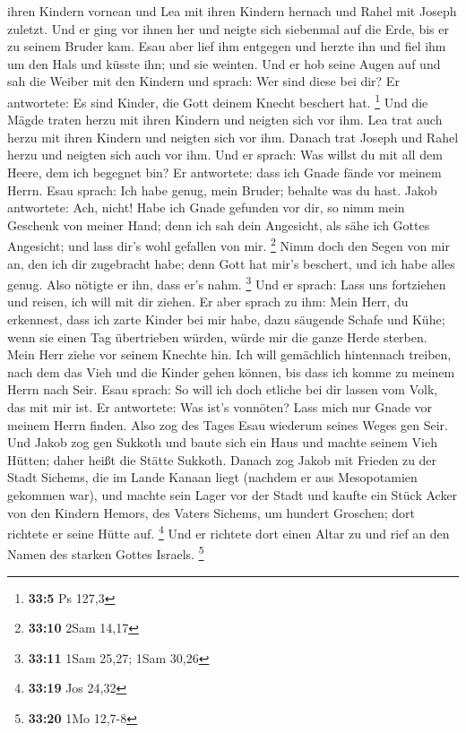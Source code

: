 ihren Kindern vornean und Lea mit ihren Kindern hernach und Rahel mit
Joseph zuletzt.  Und er ging vor ihnen her und neigte sich
siebenmal auf die Erde, bis er zu seinem Bruder kam.  Esau
aber lief ihm entgegen und herzte ihn und fiel ihm um den Hals und
küsste ihn; und sie weinten.  Und er hob seine Augen auf
und sah die Weiber mit den Kindern und sprach: Wer sind diese bei dir?
Er antwortete: Es sind Kinder, die Gott deinem Knecht beschert hat.
\footnote{\textbf{33:5} Ps 127,3}  Und die Mägde traten
herzu mit ihren Kindern und neigten sich vor ihm.  Lea
trat auch herzu mit ihren Kindern und neigten sich vor ihm. Danach trat
Joseph und Rahel herzu und neigten sich auch vor ihm.  Und
er sprach: Was willst du mit all dem Heere, dem ich begegnet bin? Er
antwortete: dass ich Gnade fände vor meinem Herrn.  Esau
sprach: Ich habe genug, mein Bruder; behalte was du hast.
 Jakob antwortete: Ach, nicht! Habe ich Gnade gefunden
vor dir, so nimm mein Geschenk von meiner Hand; denn ich sah dein
Angesicht, als sähe ich Gottes Angesicht; und lass dir's wohl gefallen
von mir. \footnote{\textbf{33:10} 2Sam 14,17}  Nimm doch
den Segen von mir an, den ich dir zugebracht habe; denn Gott hat mir's
beschert, und ich habe alles genug. Also nötigte er ihn, dass er's nahm.
\footnote{\textbf{33:11} 1Sam 25,27; 1Sam 30,26}  Und er
sprach: Lass uns fortziehen und reisen, ich will mit dir ziehen.
 Er aber sprach zu ihm: Mein Herr, du erkennest, dass ich
zarte Kinder bei mir habe, dazu säugende Schafe und Kühe; wenn sie einen
Tag übertrieben würden, würde mir die ganze Herde sterben.
 Mein Herr ziehe vor seinem Knechte hin. Ich will
gemächlich hintennach treiben, nach dem das Vieh und die Kinder gehen
können, bis dass ich komme zu meinem Herrn nach Seir. 
Esau sprach: So will ich doch etliche bei dir lassen vom Volk, das mit
mir ist. Er antwortete: Was ist's vonnöten? Lass mich nur Gnade vor
meinem Herrn finden.  Also zog des Tages Esau wiederum
seines Weges gen Seir.  Und Jakob zog gen Sukkoth und
baute sich ein Haus und machte seinem Vieh Hütten; daher heißt die
Stätte Sukkoth.  Danach zog Jakob mit Frieden zu der
Stadt Sichems, die im Lande Kanaan liegt (nachdem er aus Mesopotamien
gekommen war), und machte sein Lager vor der Stadt  und
kaufte ein Stück Acker von den Kindern Hemors, des Vaters Sichems, um
hundert Groschen; dort richtete er seine Hütte auf. \footnote{\textbf{33:19}
  Jos 24,32}  Und er richtete dort einen Altar zu und
rief an den Namen des starken Gottes Israels. \footnote{\textbf{33:20}
  1Mo 12,7-8}

